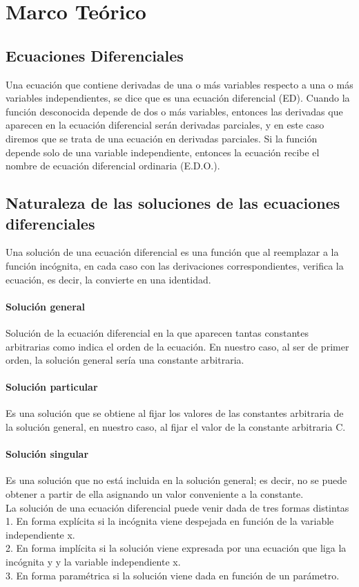 \documentclass{article}
\begin{document}
\section{Marco Teórico}
\subsection{Ecuaciones Diferenciales}
Una ecuación que contiene derivadas de una o más variables respecto a una o
más variables independientes, se dice que es una ecuación diferencial (ED).
Cuando la función desconocida depende de dos o más variables, entonces las derivadas que aparecen en la ecuación diferencial serán derivadas parciales, y en este caso diremos que se trata de una ecuación en derivadas parciales. Si la función depende solo de una variable independiente, entonces la ecuación recibe el nombre de ecuación diferencial ordinaria (E.D.O.).
\subsection{Naturaleza de las soluciones de las ecuaciones diferenciales }
Una solución de una ecuación diferencial es una función que al reemplazar a la función incógnita, en cada caso con las derivaciones correspondientes, verifica la ecuación, es decir, la convierte en una identidad. 
\paragraph{Solución general}
Solución de la ecuación diferencial en la que aparecen tantas constantes arbitrarias como indica el orden de la ecuación. En nuestro caso, al ser de primer orden, la solución general sería una constante arbitraria.
\paragraph{Solución particular}
Es una solución que se obtiene al fijar los valores de las constantes arbitraria de la solución general, en nuestro caso, al fijar el valor de la constante arbitraria C. 
\paragraph{Solución singular}
Es una solución que no está incluida en la solución general; es decir, no se puede obtener a partir de ella asignando un valor conveniente a la constante.\\ 
La solución de una ecuación diferencial puede venir dada de tres formas distintas\\ 
1. En forma explícita si la incógnita viene despejada en función de la variable independiente x.\\
2. En forma implícita si la solución viene expresada por una ecuación que liga la incógnita y y la variable independiente x.\\
3. En forma paramétrica si la solución viene dada en función de un parámetro. 
\end{document}
